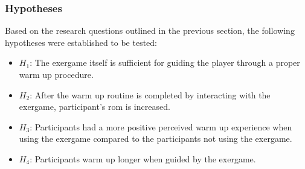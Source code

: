 \subsubsection{Hypotheses}
Based on the research questions outlined in the previous section, the following hypotheses were established to be tested: 
\begin{itemize}
\item \begin{math}H_{1}\end{math}: The exergame itself is sufficient for guiding the player through a proper warm up procedure.
\item \begin{math}H_{2}\end{math}: After the warm up routine is completed by interacting with the exergame, participant's \gls{rom} is increased.
\item \begin{math}H_{3}\end{math}: Participants had a more positive perceived warm up experience when using the exergame compared to the participants not using the exergame.  
\item \begin{math}H_{4}\end{math}: Participants warm up longer when guided by the exergame.
\end{itemize}
